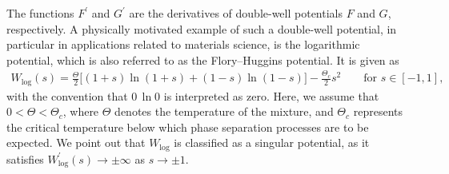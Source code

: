 \documentclass[10pt,reqno]{amsart}
\theoremstyle{remark}
\numberwithin{equation}{section}
\begin{document}
The functions $F^\prime$ and $G^\prime$ are the derivatives of double-well potentials $F$ and $G$, respectively. A physically motivated example of such a double-well potential, in particular in applications related to materials science, is the logarithmic potential, which is also referred to as the Flory--Huggins potential. It is given as
\begin{align*}
    W_{\mathrm{log}}(s) = \frac{\Theta}{2}\big[(1+s)\ln(1+s) + (1-s)\ln(1-s)\big] - \frac{\Theta_c}{2}s^2 \qquad\text{for~}s\in[-1,1],
\end{align*}
with the convention that $0\,\ln 0$ is interpreted as zero. Here, we assume that $0 < \Theta < \Theta_c$, where $\Theta$ denotes the temperature of the mixture, and $\Theta_c$ represents the critical temperature below which phase separation processes are to be expected. We point out that $W_{\mathrm{log}}$ is classified as a singular potential, as it satisfies $W_{\mathrm{log}}^\prime(s) \rightarrow \pm\infty$ as $s\rightarrow\pm 1$.
\end{document}
